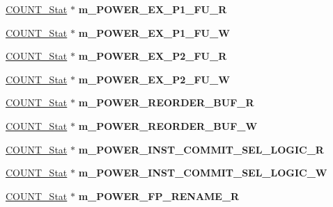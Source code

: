 \begin{DoxyCompactItemize}
\item 
\hypertarget{classall__stats__c_a2393c37d6cd8921056a2515498634b99}{
\hyperlink{classCOUNT__Stat}{COUNT\_\-Stat} $\ast$ {\bfseries m\_\-POWER\_\-EX\_\-P1\_\-FU\_\-R}}
\label{classall__stats__c_a2393c37d6cd8921056a2515498634b99}

\item 
\hypertarget{classall__stats__c_a6cb4719a34df7e53b40e14cfc17fb595}{
\hyperlink{classCOUNT__Stat}{COUNT\_\-Stat} $\ast$ {\bfseries m\_\-POWER\_\-EX\_\-P1\_\-FU\_\-W}}
\label{classall__stats__c_a6cb4719a34df7e53b40e14cfc17fb595}

\item 
\hypertarget{classall__stats__c_a13c93d880f12452ee18d48c0ce0cb01d}{
\hyperlink{classCOUNT__Stat}{COUNT\_\-Stat} $\ast$ {\bfseries m\_\-POWER\_\-EX\_\-P2\_\-FU\_\-R}}
\label{classall__stats__c_a13c93d880f12452ee18d48c0ce0cb01d}

\item 
\hypertarget{classall__stats__c_ab49f51c5a942fb5a3b95ca9c5aef1632}{
\hyperlink{classCOUNT__Stat}{COUNT\_\-Stat} $\ast$ {\bfseries m\_\-POWER\_\-EX\_\-P2\_\-FU\_\-W}}
\label{classall__stats__c_ab49f51c5a942fb5a3b95ca9c5aef1632}

\item 
\hypertarget{classall__stats__c_aac062121b04ee7f1517186579ca2be06}{
\hyperlink{classCOUNT__Stat}{COUNT\_\-Stat} $\ast$ {\bfseries m\_\-POWER\_\-REORDER\_\-BUF\_\-R}}
\label{classall__stats__c_aac062121b04ee7f1517186579ca2be06}

\item 
\hypertarget{classall__stats__c_aee1ca00877fe4a60b3ee7e8f6c4872d6}{
\hyperlink{classCOUNT__Stat}{COUNT\_\-Stat} $\ast$ {\bfseries m\_\-POWER\_\-REORDER\_\-BUF\_\-W}}
\label{classall__stats__c_aee1ca00877fe4a60b3ee7e8f6c4872d6}

\item 
\hypertarget{classall__stats__c_ae39aac0f89634234a6e6feaf87391497}{
\hyperlink{classCOUNT__Stat}{COUNT\_\-Stat} $\ast$ {\bfseries m\_\-POWER\_\-INST\_\-COMMIT\_\-SEL\_\-LOGIC\_\-R}}
\label{classall__stats__c_ae39aac0f89634234a6e6feaf87391497}

\item 
\hypertarget{classall__stats__c_a38de710c8175b71153c32e4ee7e63113}{
\hyperlink{classCOUNT__Stat}{COUNT\_\-Stat} $\ast$ {\bfseries m\_\-POWER\_\-INST\_\-COMMIT\_\-SEL\_\-LOGIC\_\-W}}
\label{classall__stats__c_a38de710c8175b71153c32e4ee7e63113}

\item 
\hypertarget{classall__stats__c_ab90ee7b7e7eef2245fdf30f3305b090d}{
\hyperlink{classCOUNT__Stat}{COUNT\_\-Stat} $\ast$ {\bfseries m\_\-POWER\_\-FP\_\-RENAME\_\-R}}
\label{classall__stats__c_ab90ee7b7e7eef2245fdf30f3305b090d}


\end{DoxyCompactItemize}
